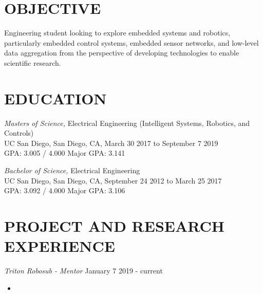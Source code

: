 \documentclass[line,margin]{res}
\begin{document}
\address{8434 Via Sonoma, \#63, La Jolla, CA 92037}
\address{nthui@eng.ucsd.edu, (408) 780-8594}


\begin{resume}

\section{OBJECTIVE}
	Engineering student looking to explore embedded systems and robotics, particularly embedded control systems, embedded sensor networks, and low-level data aggregation from the perspective of developing technologies to enable scientific research.

\section{EDUCATION}
	{\sl Masters of Science,} Electrical Engineering (Intelligent Systems, Robotics, and Controls)\\
	UC San Diego, San Diego, CA, March 30 2017 to September 7 2019\\
	GPA: 3.005 / 4.000
	Major GPA: 3.141

	{\sl Bachelor of Science,} Electrical Engineering \\
	UC San Diego, San Diego, CA, September 24 2012 to March 25 2017\\
	GPA: 3.092 / 4.000
	Major GPA: 3.106

\section{PROJECT AND RESEARCH EXPERIENCE}
	{\sl Triton Robosub - Mentor} \hfill January 7 2019 - current
	\begin{itemize}
		\item 
	\end{itemize}


\end{resume}
\end{document}
